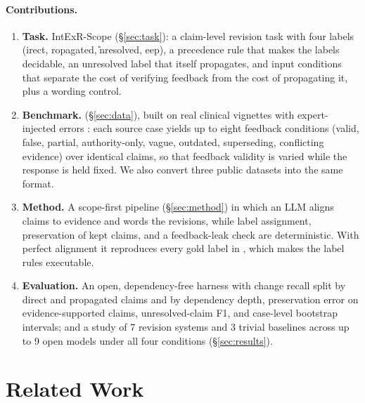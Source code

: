 \paragraph{Contributions.}
\begin{enumerate}\itemsep0pt
  \item \textbf{Task.} IntExR-Scope (\S\ref{sec:task}): a claim-level revision task with four labels (\D{}irect, \Pp{}ropagated, \U{}nresolved, \K{}eep), a precedence rule that makes the labels decidable, an unresolved label that itself propagates, and input conditions that separate the cost of verifying feedback from the cost of propagating it, plus a wording control.
  \item \textbf{Benchmark.} \ms{} (\S\ref{sec:data}), built on real clinical vignettes with expert-injected errors \citep{benabacha2025medec}: each source case yields up to eight feedback conditions (valid, false, partial, authority-only, vague, outdated, superseding, conflicting evidence) over identical claims, so that feedback validity is varied while the response is held fixed. We also convert three public datasets into the same format.
  \item \textbf{Method.} A scope-first pipeline (\S\ref{sec:method}) in which an LLM aligns claims to evidence and words the revisions, while label assignment, preservation of kept claims, and a feedback-leak check are deterministic. With perfect alignment it reproduces every gold label in \ms{}, which makes the label rules executable.
  \item \textbf{Evaluation.} An open, dependency-free harness with change recall split by direct and propagated claims and by dependency depth, preservation error on evidence-supported claims, unresolved-claim F1, and case-level bootstrap intervals; and a study of 7 revision systems and 3 trivial baselines across up to 9 open models under all four conditions (\S\ref{sec:results}).
\end{enumerate}

\section{Related Work}
\label{sec:related}
